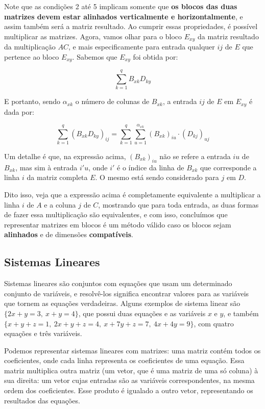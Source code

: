 \documentclass[11pt, a4paper]{article}
\begin{document}
Note que as condições 2 até 5 implicam somente que \textbf{os blocos das duas matrizes devem estar alinhados verticalmente e horizontalmente}, e assim também será a matriz resultado. Ao cumprir essas propriedades, é possível multiplicar as matrizes. Agora, vamos olhar para o bloco \(E_{xy}\) da matriz resultado da multiplicação \(AC\), e mais especificamente para entrada qualquer \(ij\) de \(E\) que pertence ao bloco \(E_{xy}\). Sabemos que \(E_{xy}\) foi obtida por:

\void[-1]

\[\sum_{k=1}^{q}B_{xk}D_{ky}\]

\void[-0.5]

E portanto, sendo \(\alpha_{xk}\) o número de colunas de \(B_{xk}\), a entrada \(ij\) de \(E\) em \(E_{xy}\) é dada por:

\void[-1]

\[\sum_{k=1}^{q}(B_{xk}D_{ky})_{ij}=\sum_{k=1}^{q}\sum_{u=1}^{\alpha_{xk}}({B_{xk}})_{iu}\cdot(D_{kj})_{uj}\]

\void[-0.5]

Um detalhe é que, na expressão acima, \(({B_{xk}})_{iu}\) não se refere a entrada \(iu\) de \(B_{xk}\), mas sim à entrada \(i'u\), onde \(i'\) é o índice da linha de \(B_{xk}\) que corresponde a linha \(i\) da matriz completa \(E\). O mesmo está sendo considerado para \(j\) em \(D\).

Dito isso, veja que a expressão acima é completamente equivalente a multiplicar a linha \(i\) de \(A\) e a coluna \(j\) de \(C\), mostrando que para toda entrada, as duas formas de fazer essa multiplicação são equivalentes, e com isso, concluímos que representar matrizes em blocos é um método válido caso os blocos sejam \textbf{alinhados} e de dimensões \textbf{compatíveis}.

\subsection{Sistemas Lineares}

Sistemas lineares são conjuntos com equações que usam um determinado conjunto de variáveis, e resolvê-los significa encontrar valores para as variáveis que tornem as equações verdadeiras. Alguns exemplos de sistema linear são \(\{2x + y = 3,\ x + y = 4\}\), que possui duas equações e as variáveis \(x\) e \(y\), e também \(\{x + y + z = 1,\ 2x + y + z = 4,\ x + 7y + z = 7,\ 4x + 4y = 9\}\), com quatro equações e três variáveis.

Podemos representar sistemas lineares com matrizes: uma matriz contém todos os coeficientes, onde cada linha representa os coeficientes de uma equação. Essa matriz multiplica outra matriz (um vetor, que é uma matriz de uma só coluna) à sua direita: um vetor cujas entradas são as variáveis correspondentes, na mesma ordem dos coeficientes. Esse produto é igualado a outro vetor, representando os resultados das equações.
\end{document}
